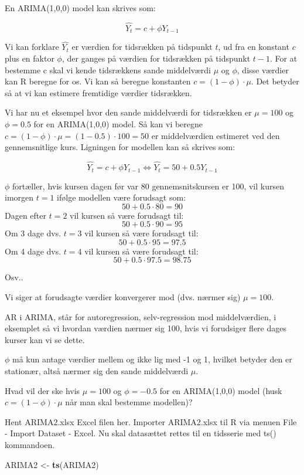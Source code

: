 \documentclass[]{book}
\newenvironment{Shaded}{\begin{snugshade}}{\end{snugshade}}
\newcommand{\KeywordTok}[1]{\textcolor[rgb]{0.13,0.29,0.53}{\textbf{#1}}}
\newcommand{\NormalTok}[1]{#1}
\newcommand{\StringTok}[1]{\textcolor[rgb]{0.31,0.60,0.02}{#1}}
\begin{document}
En ARIMA(1,0,0) model kan skrives som:

\[\hat{Y_t}=c + \phi Y_{t-1}\]

Vi kan forklare \(\hat{Y_t}\) er værdien for tidsrækken på tidspunkt \(t\), ud fra en konstant \(c\) plus en faktor \(\phi\), der ganges på værdien for tidsrækken på tidspunkt \(t-1\). For at bestemme c skal vi kende tidsrækkens sande middelværdi \(\mu\) og \(\phi\), disse værdier kan R beregne for os. Vi kan så beregne konstanten \(c=(1-\phi)\cdot \mu\). Det betyder så at vi kan estimere fremtidige værdier tidsrækken.

Vi har nu et eksempel hvor den sande middelværdi for tidsrækken er \(\mu=100\) og \(\phi=0.5\) for en ARIMA(1,0,0) model. Så kan vi beregne \(c=(1-\phi)\cdot \mu=(1-0.5)\cdot 100=50\) er middelværdien estimeret ved den gennemsnitlige kurs. Ligningen for modellen kan så skrives som:

\[\hat{Y_t}=c + \phi Y_{t-1} \Leftrightarrow \hat{Y_t}=50 + 0.5 Y_{t-1}\]

\(\phi\) fortæller, hvis kursen dagen før var 80 gennemsnitskursen er 100, vil kursen imorgen \(t=1\) ifølge modellen være forudsagt som:
\[50+0.5\cdot 80=90\]
Dagen efter \(t=2\) vil kursen så være forudsagt til:
\[50+0.5\cdot 90=95\]
Om 3 dage dvs. \(t=3\) vil kursen så være forudsagt til:
\[50+0.5\cdot 95=97.5\]
Om 4 dage dvs. \(t=4\) vil kursen så være forudsagt til:
\[50+0.5\cdot 97.5=98.75\]

Osv..

Vi siger at forudsagte værdier konvergerer mod (dvs. nærmer sig) \(\mu=100\).

AR i ARIMA, står for autoregression, selv-regression mod middelværdien, i eksemplet så vi hvordan værdien nærmer sig 100, hvis vi forudsiger flere dages kurser kan vi se dette.

\(\phi\) må kun antage værdier mellem og ikke lig med -1 og 1, hvilket betyder den er stationær, altså nærmer sig den sande middelværdi \(\mu\).

Hvad vil der ske hvis \(\mu=100\) og \(\phi=-0.5\) for en ARIMA(1,0,0) model (husk \(c=(1-\phi)\cdot\mu\) når man skal bestemme modellen)?

Hent ARIMA2.xlsx Excel filen her. Importer ARIMA2.xlsx til R via menuen File - Import Dataset - Excel. Nu skal datasættet rettes til en tidsserie med ts() kommandoen.

\begin{Shaded}
\begin{Highlighting}[]
\NormalTok{ARIMA2 <-}\StringTok{ }\KeywordTok{ts}\NormalTok{(ARIMA2)}
\end{Highlighting}
\end{Shaded}
\end{document}
